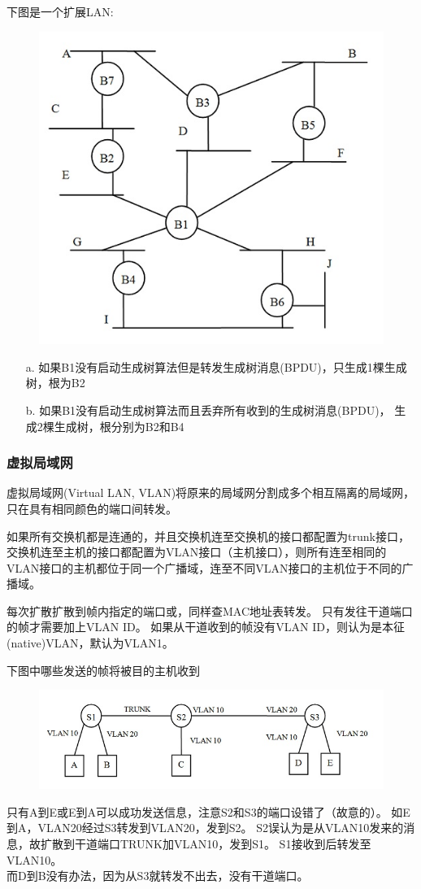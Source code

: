 \begin{example}
	下图是一个扩展LAN:
	\begin{figure}[H]
		\centering
		\includegraphics[width=0.4\linewidth]{fig/spanning_tree.jpg}
	\end{figure}
\end{example}
\begin{analysis}
	\begin{itemize}
		\item[a.] 如果B1没有启动生成树算法但是转发生成树消息(BPDU)，只生成1棵生成树，根为B2
		\item[b.] 如果B1没有启动生成树算法而且丢弃所有收到的生成树消息(BPDU)，
		生成2棵生成树，根分别为B2和B4
	\end{itemize}
\end{analysis}

\subsubsection{虚拟局域网}
虚拟局域网(Virtual LAN, VLAN)将原来的局域网分割成多个相互隔离的局域网，只在具有相同颜色的端口间转发。

如果所有交换机都是连通的，并且交换机连至交换机的接口都配置为trunk接口，交换机连至主机的接口都配置为VLAN接口（主机接口），则所有连至相同的VLAN接口的主机都位于同一个广播域，连至不同VLAN接口的主机位于不同的广播域。

每次扩散扩散到帧内指定的端口或，同样查MAC地址表转发。
只有发往干道端口的帧才需要加上VLAN ID。
如果从干道收到的帧没有VLAN ID，则认为是本征(native)VLAN，默认为VLAN1。
\begin{example}
	下图中哪些发送的帧将被目的主机收到
	\begin{figure}[H]
		\centering
		\includegraphics[width=0.6\linewidth]{fig/vlan.jpg}
	\end{figure}
\end{example}
\begin{analysis}
	只有A到E或E到A可以成功发送信息，注意S2和S3的端口设错了（故意的）。
	如E到A，VLAN20经过S3转发到VLAN20，发到S2。
	S2误认为是从VLAN10发来的消息，故扩散到干道端口TRUNK加VLAN10，发到S1。
	S1接收到后转发至VLAN10。\\
	而D到B没有办法，因为从S3就转发不出去，没有干道端口。
\end{analysis}

